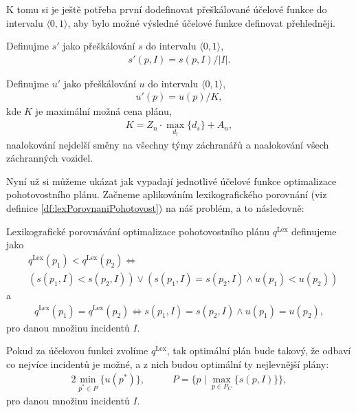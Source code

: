 K tomu si je ještě potřeba první dodefinovat přeškálované účelové funkce do intervalu $\langle 0, 1 \rangle$, aby
bylo možné výsledné účelové funkce definovat přehledněji.
\begin{definice} \label{df:simulaceSkal}
  Definujme $s'$ jako přeškálování $s$ do intervalu $\langle 0, 1 \rangle$,
  \begin{align*}
    s'(p, I) = s(p, I) / |I|.
  \end{align*}
\end{definice}
\begin{definice} \label{df:cenaPlanuSkal}
  Definujme $u'$ jako přeškálování $u$ do intervalu $\langle 0, 1 \rangle$,
  \begin{align*}
    u'(p) = u(p) / K,
  \end{align*}
  kde $K$ je maximální možná cena plánu,
  \begin{align*}
    K = Z_n \cdot \max_{d_l} \{ d_s \} + A_n,
  \end{align*}
  naalokování nejdelší směny na všechny týmy záchranářů a naalokování všech záchranných vozidel.
\end{definice}

Nyní už si můžeme ukázat jak vypadají jednotlivé účelové funkce optimalizace pohotovostního plánu.
Začneme aplikováním lexikografického porovnání (viz definice \ref{df:lexPorovnaniPohotovost}) na náš problém, a to následovně:
\begin{definice}\label{df:lexPorovnaniPohotovost}
  Lexikografické porovnávání optimalizace pohotovostního plánu $q^{\text{Lex}}$ definujeme jako
  \begin{align*}
    & q^{\text{Lex}}(p_1) < q^{\text{Lex}}(p_2)\Leftrightarrow\\
    & ( s(p_1, I) < s(p_2, I)) \lor (s(p_1, I) = s(p_2, I) \land u(p_1) < u(p_2))
  \end{align*}
  a 
  \begin{align*}
    q^{\text{Lex}}(p_1) = q^{\text{Lex}}(p_2) \Leftrightarrow s(p_1, I) = s(p_2, I) \land u(p_1) = u(p_2),
  \end{align*}
  pro danou množinu incidentů $I$.
\end{definice}

Pokud za účelovou funkci zvolíme $q^{\text{Lex}}$, tak optimální plán bude takový, že odbaví co nejvíce incidentů je možné, a z nich budou optimální ty nejlevnější plány:
\begin{alignat*}{2}
  \min_{p^* \in P} \{ u(p^*) \}, && \hspace{15pt} P = \{ p \mid \max_{p \in P_C} \{ s(p, I) \} \},
\end{alignat*}
pro danou množinu incidentů $I$.

